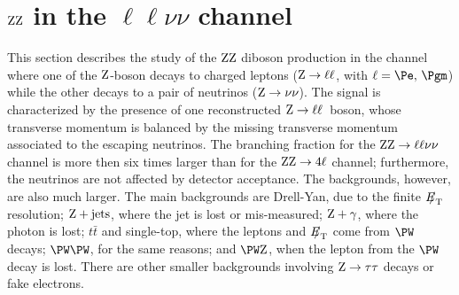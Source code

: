 \def\RhoEleZZ{ \ensuremath{ 0.714 \pm 0.007 }\xspace }
\def\RhoMuoZZ{ \ensuremath{ 0.779 \pm 0.007 }\xspace }
\def\RhoEleWZ{ \ensuremath{ 0.725 \pm 0.010 }\xspace }
\def\RhoMuoWZ{ \ensuremath{ 0.790 \pm 0.010 }\xspace }

\def\ZZElecXsect{\ensuremath{ 180 \pm 54\,_{\mathrm{(stat)}}\, \pm 34\,_{\mathrm{(syst)}}\, \pm 11\,_{\mathrm{(lumi)}} \ \mathrm{fb} }\xspace }
\def\ZZMuonXsect{\ensuremath{ 122 \pm 38\,_{\mathrm{(stat)}}\, \pm 20\,_{\mathrm{(syst)}}\, \pm \ \, 7\,_{\mathrm{(lumi)}} \ \mathrm{fb} }\xspace }
\def\ZZCombXsect{\ensuremath{ 151 \pm 47\,_{\mathrm{(stat)}}\, \pm 27\,_{\mathrm{(syst)}}\, \pm \ \, 9\,_{\mathrm{(lumi)}} \ \mathrm{fb} }\xspace }

\def\ZZXsect{\ensuremath{ 11.2 \pm 3.5\,_{\mathrm{(stat)}}\, \pm 2.0\,_{\mathrm{(syst)}}\, \pm 0.7\,_{\mathrm{(lumi)}} \ \mathrm{pb} }\xspace }

\def\FqLimTwoSig{\ensuremath{\displaystyle -0.080 < f_{4}^{Z}  < 0.080 }\xspace }
\def\FcLimTwoSig{\ensuremath{\displaystyle -0.077 < f_{5}^{Z}  < 0.077 }\xspace }
\def\FqLimOneSig{\ensuremath{\displaystyle -0.051 < f_{4}^{Z}  < 0.051 }\xspace }
\def\FcLimOneSig{\ensuremath{\displaystyle -0.051 < f_{5}^{Z}  < 0.051 }\xspace }


\section{$\mathrm{Z}\mathrm{Z}$ in the $\ell\ell\nu\nu$ channel}

This section describes the study of the $\mathrm{Z}\mathrm{Z}$ diboson production in the channel where one of the $\mathrm{Z}$-boson decays to charged leptons ($\mathrm{Z}\to\ell\ell$, with $\ell=\Pe,\,\Pgm$) while the other decays to a pair of neutrinos ($\mathrm{Z}\to\nu\nu$).  The signal is characterized by the presence of one reconstructed $\mathrm{Z}\to\ell\ell\,$ boson, whose transverse momentum is balanced by the missing transverse momentum associated to the escaping neutrinos. The branching fraction for the $\mathrm{Z}\mathrm{Z}\to\ell\ell\nu\nu$ channel is more then six times larger than for the $\mathrm{Z}\mathrm{Z}\to4\ell$ channel; furthermore, the neutrinos are not affected by detector acceptance. The backgrounds, however, are also much larger. The main backgrounds are Drell-Yan, due to the finite ${E\!\!\!/}_{\mathrm{T}}$ resolution; $\mathrm{Z}+{\mathrm {jets}}$, where the jet is lost or mis-measured; $\mathrm{Z}+\gamma$, where the photon is lost; $t\bar{t}$ and single-top, where the leptons and ${E\!\!\!/}_{\mathrm{T}}$ come from $\PW$ decays; $\WW$, for the same reasons; and $\WZ$, when the lepton from the $\PW$ decay is lost.  There are other smaller backgrounds involving $\mathrm{Z}\to\tau\tau$ decays or fake electrons.


